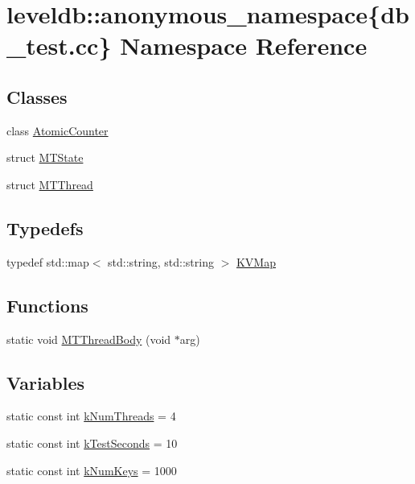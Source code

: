 \hypertarget{namespaceleveldb_1_1anonymous__namespace_02db__test_8cc_03}{}\section{leveldb\+:\+:anonymous\+\_\+namespace\{db\+\_\+test.\+cc\} Namespace Reference}
\label{namespaceleveldb_1_1anonymous__namespace_02db__test_8cc_03}
\subsection*{Classes}
\begin{DoxyCompactItemize}
\item 
class \hyperlink{classleveldb_1_1anonymous__namespace_02db__test_8cc_03_1_1_atomic_counter}{Atomic\+Counter}
\item 
struct \hyperlink{structleveldb_1_1anonymous__namespace_02db__test_8cc_03_1_1_m_t_state}{M\+T\+State}
\item 
struct \hyperlink{structleveldb_1_1anonymous__namespace_02db__test_8cc_03_1_1_m_t_thread}{M\+T\+Thread}
\end{DoxyCompactItemize}
\subsection*{Typedefs}
\begin{DoxyCompactItemize}
\item 
typedef std\+::map$<$ std\+::string, std\+::string $>$ \hyperlink{namespaceleveldb_1_1anonymous__namespace_02db__test_8cc_03_ab08897aad592a2400f41ea20db7473d5}{K\+V\+Map}
\end{DoxyCompactItemize}
\subsection*{Functions}
\begin{DoxyCompactItemize}
\item 
static void \hyperlink{namespaceleveldb_1_1anonymous__namespace_02db__test_8cc_03_a6339412a93f4350fbce4b929bc59fe4f}{M\+T\+Thread\+Body} (void $\ast$arg)
\end{DoxyCompactItemize}
\subsection*{Variables}
\begin{DoxyCompactItemize}
\item 
static const int \hyperlink{namespaceleveldb_1_1anonymous__namespace_02db__test_8cc_03_af135e865a9f018d5bbf890a1c60aeed0}{k\+Num\+Threads} = 4
\item 
static const int \hyperlink{namespaceleveldb_1_1anonymous__namespace_02db__test_8cc_03_a1dd70bf55ed2f6a85462480871d5a32d}{k\+Test\+Seconds} = 10
\item 
static const int \hyperlink{namespaceleveldb_1_1anonymous__namespace_02db__test_8cc_03_a27ae32b8ef5b6166eb680ef2740ac7f7}{k\+Num\+Keys} = 1000
\end{DoxyCompactItemize}


